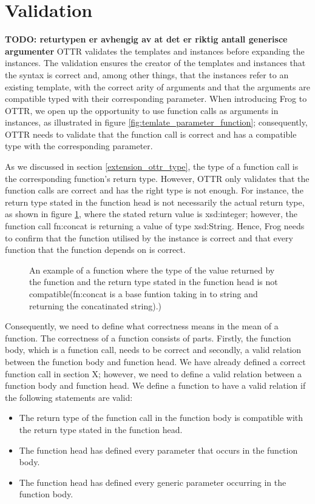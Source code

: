\section{Validation}
\label{designValidation}
\textbf{TODO: returtypen er avhengig av at det er riktig antall generisce argumenter}
OTTR validates the templates and instances before expanding the instances. The validation ensures the creator of the templates and instances that the syntax is correct and, among other things, that the instances refer to an existing template, with the correct arity of arguments and that the arguments are compatible typed with their corresponding parameter. When introducing Frog to OTTR, we open up the opportunity to use function calls as arguments in instances, as illustrated in figure \ref{fig:temlate_parameter_function}; consequently, OTTR needs to validate that the function call is correct and has a compatible type with the corresponding parameter. 

\para
As we discussed in section \ref{extension_ottr_type}, the type of a function call is the corresponding function's return type. However, OTTR only validates that the function calls are correct and has the right type is not enough. For instance, the return type stated in the function head is not necessarily the actual return type, as shown in figure \ref{fig:wrong_function}, where the stated return value is xsd:integer; however, the function call fn:concat is returning a value of type xsd:String. Hence, Frog needs to confirm that the function utilised by the instance is correct and that every function that the function depends on is correct.

\begin{figure}
    \centering
    
    \caption{An example of a function where the type of the value returned by the function and the return type stated in the function head is not compatible(fn:concat is a base funtion taking in to string and returning the concatinated string).)}
    \label{fig:wrong_function}
\end{figure}

\para
Consequently, we need to define what correctness means in the mean of a function. The correctness of a function consists of parts. Firstly, the function body, which is a function call, needs to be correct and secondly, a valid relation between the function body and function head. We have already defined a correct function call in section X; however, we need to define a valid relation between a function body and function head. We define a function to have a valid relation if the following statements are valid:
\begin{itemize}
    \item The return type of the function call in the function body is compatible with the return type stated in the function head. 
    \item The function head has defined every parameter that occurs in the function body.
    \item The function head has defined every generic parameter occurring in the function body.
\end{itemize} 

